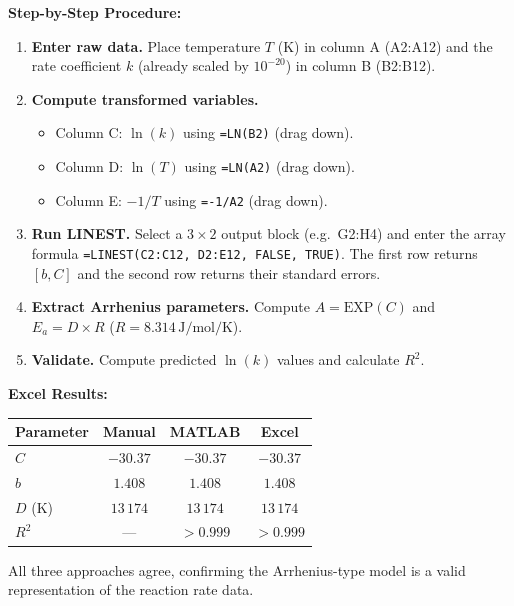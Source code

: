 \documentclass[12pt,a4paper]{article}
\begin{document}
\textbf{Step-by-Step Procedure:}
\begin{enumerate}
  \item \textbf{Enter raw data.} Place temperature $T$ (K) in column A (A2:A12) and
        the rate coefficient $k$ (already scaled by $10^{-20}$) in column B (B2:B12).
  \item \textbf{Compute transformed variables.}
        \begin{itemize}
          \item Column C: $\ln(k)$ using \texttt{=LN(B2)} (drag down).
          \item Column D: $\ln(T)$ using \texttt{=LN(A2)} (drag down).
          \item Column E: $-1/T$ using \texttt{=-1/A2} (drag down).
        \end{itemize}
  \item \textbf{Run LINEST.} Select a $3\times2$ output block (e.g.\ G2:H4) and enter
        the array formula \texttt{=LINEST(C2:C12, D2:E12, FALSE, TRUE)}.
        The first row returns $[b, C]$ and the second row returns their standard errors.
  \item \textbf{Extract Arrhenius parameters.} Compute $A = \text{EXP}(C)$ and
        $E_a = D \times R$ ($R = 8.314\,\text{J/mol/K}$).
  \item \textbf{Validate.} Compute predicted $\ln(k)$ values and calculate $R^2$.
\end{enumerate}

\textbf{Excel Results:}

\begin{center}
\begin{tabular}{lccc}
  \toprule
  \textbf{Parameter} & \textbf{Manual} & \textbf{MATLAB} & \textbf{Excel} \\
  \midrule
  $C$ & $-30.37$ & $-30.37$ & $-30.37$ \\
  $b$ & $1.408$  & $1.408$  & $1.408$  \\
  $D$ (K) & $13\,174$ & $13\,174$ & $13\,174$ \\
  $R^2$ & --- & $> 0.999$ & $> 0.999$ \\
  \bottomrule
\end{tabular}
\end{center}

All three approaches agree, confirming the Arrhenius-type model is a valid representation
of the reaction rate data.

\newpage

\end{document}

